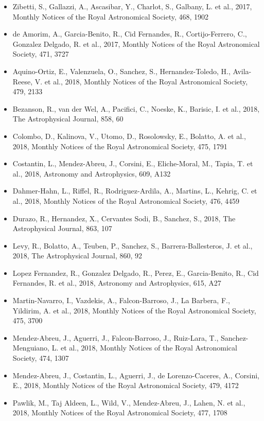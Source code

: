 \documentclass{letter}
\begin{document}
\begin{enumerate}
\begin{itemize}
\item Zibetti, S., Gallazzi, A., Ascasibar, Y., Charlot, S., Galbany, L. et al., 2017, Monthly Notices of the Royal Astronomical Society, 468, 1902
\item de Amorim, A., Garcia-Benito, R., Cid Fernandes, R., Cortijo-Ferrero, C., Gonzalez Delgado, R. et al., 2017, Monthly Notices of the Royal Astronomical Society, 471, 3727
\item Aquino-Ortiz, E., Valenzuela, O., Sanchez, S., Hernandez-Toledo, H., Avila-Reese, V. et al., 2018, Monthly Notices of the Royal Astronomical Society, 479, 2133
\item Bezanson, R., van der Wel, A., Pacifici, C., Noeske, K., Barisic, I. et al., 2018, The Astrophysical Journal, 858, 60
\item Colombo, D., Kalinova, V., Utomo, D., Rosolowsky, E., Bolatto, A. et al., 2018, Monthly Notices of the Royal Astronomical Society, 475, 1791
\item Costantin, L., Mendez-Abreu, J., Corsini, E., Eliche-Moral, M., Tapia, T. et al., 2018, Astronomy and Astrophysics, 609, A132
\item Dahmer-Hahn, L., Riffel, R., Rodriguez-Ardila, A., Martins, L., Kehrig, C. et al., 2018, Monthly Notices of the Royal Astronomical Society, 476, 4459
\item Durazo, R., Hernandez, X., Cervantes Sodi, B., Sanchez, S., 2018, The Astrophysical Journal, 863, 107
\item Levy, R., Bolatto, A., Teuben, P., Sanchez, S., Barrera-Ballesteros, J. et al., 2018, The Astrophysical Journal, 860, 92
\item Lopez Fernandez, R., Gonzalez Delgado, R., Perez, E., Garcia-Benito, R., Cid Fernandes, R. et al., 2018, Astronomy and Astrophysics, 615, A27
\item Martin-Navarro, I., Vazdekis, A., Falcon-Barroso, J., La Barbera, F., Yildirim, A. et al., 2018, Monthly Notices of the Royal Astronomical Society, 475, 3700
\item Mendez-Abreu, J., Aguerri, J., Falcon-Barroso, J., Ruiz-Lara, T., Sanchez-Menguiano, L. et al., 2018, Monthly Notices of the Royal Astronomical Society, 474, 1307
\item Mendez-Abreu, J., Costantin, L., Aguerri, J., de Lorenzo-Caceres, A., Corsini, E., 2018, Monthly Notices of the Royal Astronomical Society, 479, 4172
\item Pawlik, M., Taj Aldeen, L., Wild, V., Mendez-Abreu, J., Lahen, N. et al., 2018, Monthly Notices of the Royal Astronomical Society, 477, 1708

\end{itemize}
\end{enumerate}
\end{document}
